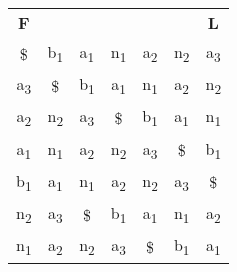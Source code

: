     \bigskip
    \begin{example}
        \begin{tabular}{ c c c c c c c }
            \textbf{F}         &
                               &
                               &
                               &
                               &
                               &
            \textbf{L}         \\
        
            \$                 &
            b\textsubscript{1} &
            a\textsubscript{1} &
            n\textsubscript{1} &
            a\textsubscript{2} & 
            n\textsubscript{2} &
            a\textsubscript{3} \\
            
            a\textsubscript{3} &
            \$                 &
            b\textsubscript{1} &
            a\textsubscript{1} &
            n\textsubscript{1} &
            a\textsubscript{2} & 
            n\textsubscript{2} \\
            
            a\textsubscript{2} &
            n\textsubscript{2} &
            a\textsubscript{3} &
            \$                 &
            b\textsubscript{1} &
            a\textsubscript{1} &
            n\textsubscript{1} \\
            
            a\textsubscript{1} &
            n\textsubscript{1} &
            a\textsubscript{2} &
            n\textsubscript{2} &
            a\textsubscript{3} &
            \$                 &
            b\textsubscript{1} \\
            
            b\textsubscript{1} &
            a\textsubscript{1} &
            n\textsubscript{1} &
            a\textsubscript{2} &
            n\textsubscript{2} &
            a\textsubscript{3} &
            \$                 \\
            
            n\textsubscript{2} &
            a\textsubscript{3} &
            \$                 &
            b\textsubscript{1} &
            a\textsubscript{1} &
            n\textsubscript{1} &
            a\textsubscript{2} \\ 
            
            n\textsubscript{1} &
            a\textsubscript{2} &
            n\textsubscript{2} &
            a\textsubscript{3} &
            \$                 &
            b\textsubscript{1} &
            a\textsubscript{1} \\
        \end{tabular}
    \end{example}
    \bigskip
    
